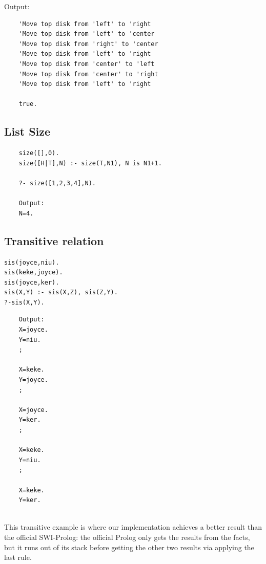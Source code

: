 \documentclass[11pt,a4paper]{report}
\begin{document}
Output:
\begin{lstlisting}
	'Move top disk from 'left' to 'right
	'Move top disk from 'left' to 'center
	'Move top disk from 'right' to 'center
	'Move top disk from 'left' to 'right
	'Move top disk from 'center' to 'left
	'Move top disk from 'center' to 'right
	'Move top disk from 'left' to 'right
	
	true.
\end{lstlisting}

\subsection*{List Size}
\begin{lstlisting}
	size([],0).
	size([H|T],N) :- size(T,N1), N is N1+1.
	
	?- size([1,2,3,4],N).
	
	Output: 
	N=4.
\end{lstlisting}



\subsection*{Transitive relation}
\begin{lstlisting}
sis(joyce,niu).
sis(keke,joyce).
sis(joyce,ker).
sis(X,Y) :- sis(X,Z), sis(Z,Y).
?-sis(X,Y).
\end{lstlisting}

\begin{lstlisting}
	Output:
	X=joyce.
	Y=niu.
	;
	
	X=keke.
	Y=joyce.
	;
	
	X=joyce.
	Y=ker.
	;
	
	X=keke.
	Y=niu.
	;
	
	X=keke.
	Y=ker.
	
\end{lstlisting}

This transitive example is where our implementation achieves a better result than the official SWI-Prolog: the official Prolog only gets the results from the facts, but it runs out of its stack before getting the other two results via applying the last rule. 

\bigskip
\end{document}
